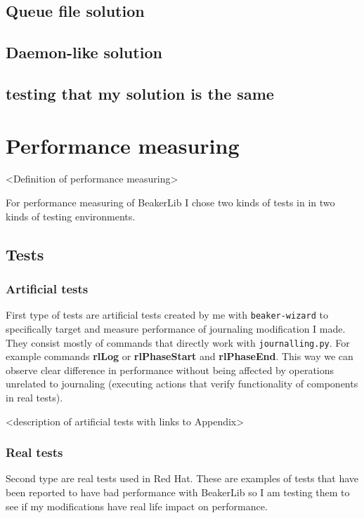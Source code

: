 \section{Queue file solution}
\section{Daemon-like solution}

\section{testing that my solution is the same}

\chapter{Performance measuring}
<Definition of performance measuring>

For performance measuring of BeakerLib I chose two kinds of tests in in two kinds of testing environments.

\section{Tests}

\subsection{Artificial tests}
First type of tests are artificial tests created by me with \texttt{beaker-wizard} to specifically target and measure performance of journaling modification I made. They consist mostly of commands that directly work with \texttt{journalling.py}. For example commands \textbf{rlLog} or \textbf{rlPhaseStart} and \textbf{rlPhaseEnd}. This way we can observe clear difference in performance without being affected by operations unrelated to journaling (executing actions that verify functionality of components in real tests). 

<description of artificial tests with links to Appendix>

\subsection{Real tests}
Second type are real tests used in Red Hat. These are examples of tests that have been reported to have bad performance with BeakerLib so I am testing them to see if my modifications have real life impact on performance.

